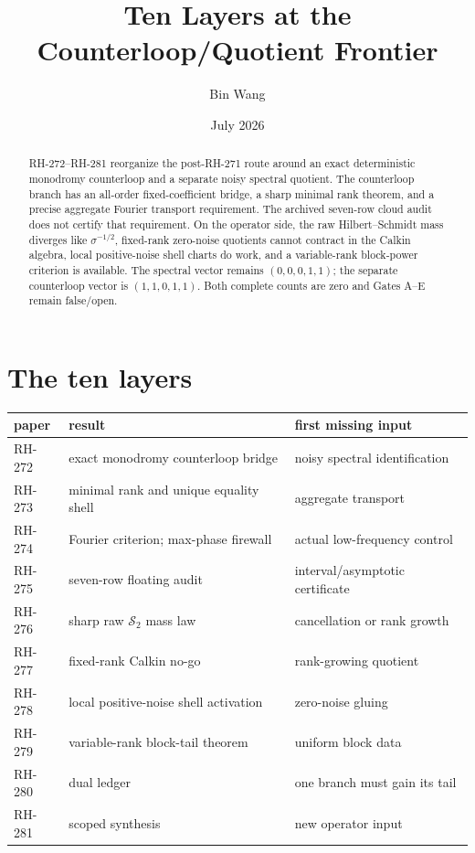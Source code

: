\documentclass[11pt]{article}
\title{Ten Layers at the Counterloop/Quotient Frontier}\author{Bin Wang}\date{July 2026}
\begin{document}
\maketitle
\begin{abstract}
RH-272--RH-281 reorganize the post-RH-271 route around an exact deterministic
monodromy counterloop and a separate noisy spectral quotient.  The
counterloop branch has an all-order fixed-coefficient bridge, a sharp minimal
rank theorem, and a precise aggregate Fourier transport requirement.  The
archived seven-row cloud audit does not certify that requirement.  On the
operator side, the raw Hilbert--Schmidt mass diverges like $\sigma^{-1/2}$,
fixed-rank zero-noise quotients cannot contract in the Calkin algebra, local
positive-noise shell charts do work, and a variable-rank block-power criterion
is available.  The spectral vector remains $(0,0,0,1,1)$; the separate
counterloop vector is $(1,1,0,1,1)$.  Both complete counts are zero and
Gates A--E remain false/open.
\end{abstract}
\section{The ten layers}
\begin{center}\small
\begin{tabular}{lll}\toprule
paper & result & first missing input\\\midrule
RH-272 & exact monodromy counterloop bridge & noisy spectral identification\\
RH-273 & minimal rank and unique equality shell & aggregate transport\\
RH-274 & Fourier criterion; max-phase firewall & actual low-frequency control\\
RH-275 & seven-row floating audit & interval/asymptotic certificate\\
RH-276 & sharp raw $\mathcal S_2$ mass law & cancellation or rank growth\\
RH-277 & fixed-rank Calkin no-go & rank-growing quotient\\
RH-278 & local positive-noise shell activation & zero-noise gluing\\
RH-279 & variable-rank block-tail theorem & uniform block data\\
RH-280 & dual ledger & one branch must gain its tail\\
RH-281 & scoped synthesis & new operator input\\\bottomrule
\end{tabular}
\end{center}
\end{document}
